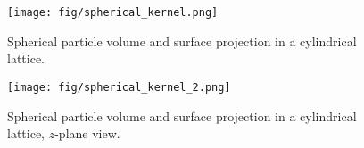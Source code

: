 \documentclass[10pt, a4paper]{article}
\begin{document}
\begin{multicols}{2}






\begin{figure}[H]
        \centering
        \texttt{[image: fig/spherical\_kernel.png]}
        \caption{
            Spherical particle volume and surface projection in a cylindrical lattice.
        }
        \label{fig:spherical_kernel}
    \end{figure}

\begin{figure}[H]
    \centering
    \texttt{[image: fig/spherical\_kernel\_2.png]}
    \caption{
        Spherical particle volume and surface projection in a cylindrical lattice, $z$-plane view.
    }
    \label{fig:spherical_kernel}
\end{figure}
    
\end{multicols}


\end{document}
